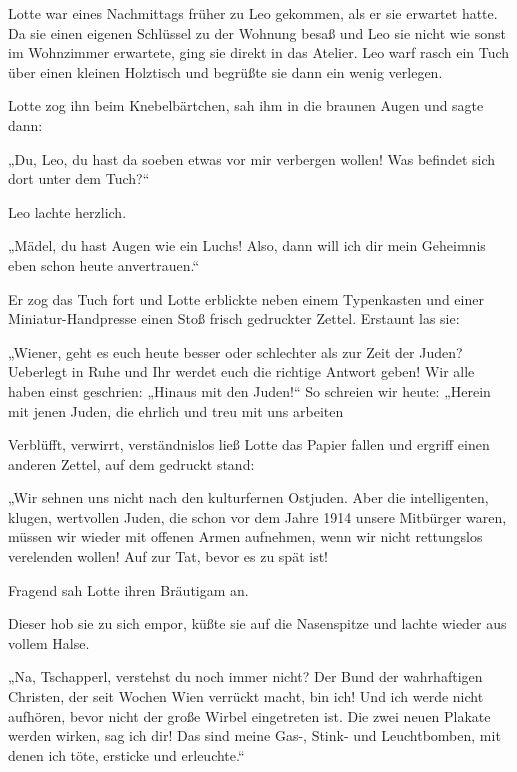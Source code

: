 Lotte war eines Nachmittags früher zu Leo gekommen, als er sie
erwartet hatte. Da sie einen eigenen  Schlüssel zu
der Wohnung besaß und Leo sie nicht wie sonst im Wohnzimmer
erwartete, ging sie direkt in das Atelier. Leo warf rasch ein Tuch
über einen kleinen Holztisch und begrüßte sie dann ein wenig
verlegen.

Lotte zog ihn beim Knebelbärtchen, sah ihm in die braunen Augen und
sagte dann:

„Du, Leo, du hast da soeben etwas vor mir verbergen wollen! Was
befindet sich dort unter dem Tuch?“

Leo lachte herzlich.

„Mädel, du hast Augen wie ein Luchs! Also, dann will ich dir mein
Geheimnis eben schon heute anvertrauen.“

Er zog das Tuch fort und Lotte erblickte neben einem Typenkasten
und einer Miniatur-Handpresse einen Stoß frisch gedruckter Zettel.
Erstaunt las sie:

„Wiener, geht es euch heute besser oder schlechter als zur Zeit der
Juden? Ueberlegt in Ruhe und Ihr werdet euch die richtige Antwort
geben! Wir alle haben einst geschrien: „Hinaus mit den Juden!“ So
schreien wir heute: „Herein mit jenen Juden, die ehrlich und treu
mit uns arbeiten 


Verblüfft, verwirrt, verständnislos ließ Lotte das Papier fallen
und ergriff einen anderen Zettel, auf dem gedruckt stand:

„Wir sehnen uns nicht nach den kulturfernen Ostjuden. Aber die
intelligenten, klugen, wertvollen Juden, die schon vor dem Jahre
1914 unsere Mitbürger waren, müssen  wir wieder mit
offenen Armen aufnehmen, wenn wir nicht rettungslos verelenden
wollen! Auf zur Tat, bevor es zu spät ist!


Fragend sah Lotte ihren Bräutigam an.

Dieser hob sie zu sich empor, küßte sie auf die Nasenspitze und
lachte wieder aus vollem Halse.

„Na, Tschapperl, verstehst du noch immer nicht? Der Bund der
wahrhaftigen Christen, der seit Wochen Wien verrückt macht, bin
ich! Und ich werde nicht aufhören, bevor nicht der große Wirbel
eingetreten ist. Die zwei neuen Plakate werden wirken, sag ich dir!
Das sind meine Gas-, Stink- und Leuchtbomben, mit denen ich töte,
ersticke und erleuchte.“

